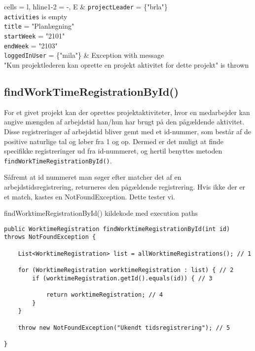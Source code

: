 \begin{table}[H]
\begin{tblr}{
  cells = {l},
  hline{1-2} = {-}{},
}
E & 
{
    \texttt{projectLeader} = \{"brla"\} \\
    \texttt{activities} is empty \\
    \texttt{title} = "Planlægning" \\
    \texttt{startWeek} = "2101" \\ 
    \texttt{endWeek} = "2103" \\
    \texttt{loggedInUser} = \{"mila"\}
} & 
{
    Exception with message \\ 
    "Kun projektlederen kan oprette en projekt aktivitet for dette projekt" is thrown
} \\

\end{tblr}
\end{table}

\subsection{findWorkTimeRegistrationById()} \label{sec:white_box_find_work_time}

For et givet projekt kan der oprettes projektaktiviteter, hvor en medarbejder kan angive mængden af arbejdstid han/hun har brugt på den pågældende aktivitet. Disse registreringer af arbejdstid bliver gemt med et id-nummer, som består af de positive naturlige tal og løber fra 1 og op. Dermed er det muligt at finde specifikke registreringer ud fra id-nummeret, og hertil benyttes metoden \texttt{findWorkTimeRegistrationById()}. 

Såfremt at id nummeret man søger efter matcher det af en arbejdstidsregistrering, returneres den pågældende registrering. Hvis ikke der er et match, kastes en NotFoundException. Dette tester vi.

\begin{listing}[H]
    \centering
    \caption{findWorktimeRegistrationById() kildekode med execution paths}\label{lst:find_work_time_registration_by_id_source_code}
    \begin{verbatim}
public WorktimeRegistration findWorktimeRegistrationById(int id) throws NotFoundException {
    
    List<WorktimeRegistration> list = allWorktimeRegistrations(); // 1

    for (WorktimeRegistration worktimeRegistration : list) { // 2
        if (worktimeRegistration.getId().equals(id)) { // 3
            
            return worktimeRegistration; // 4
        }
    }

    throw new NotFoundException("Ukendt tidsregistrering"); // 5

}
    \end{verbatim}
\end{listing}

